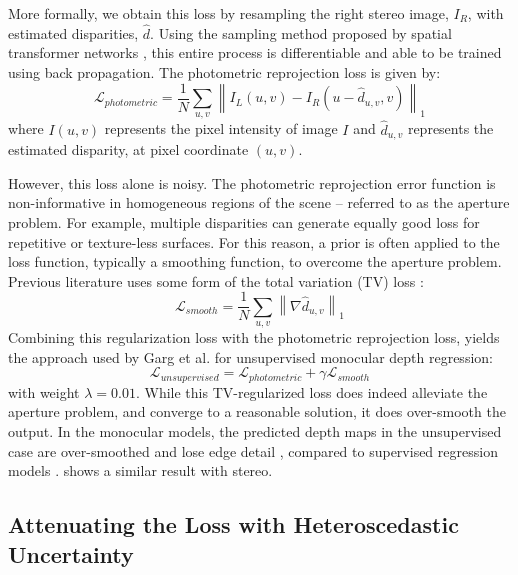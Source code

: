 More formally, we obtain this loss by resampling the right stereo image, $I_R$, with estimated disparities, $\hat{d}$. Using the sampling method proposed by spatial transformer networks \citep{jaderberg2015spatial}, this entire process is differentiable and able to be trained using back propagation. The photometric reprojection loss is given by:
\begin{equation}
\mathcal{L}_{photometric} = \frac{1}{N} \sum\limits_{u,v} \left\lVert I_L(u,v) - I_R(u-\hat{d}_{u,v},v) \right\rVert_1
\label{eqn:unsupervised_loss}
\end{equation}
where $I(u,v)$ represents the pixel intensity of image $I$ and $\hat{d}_{u,v}$ represents the estimated disparity, at pixel coordinate $(u,v)$.

However, this loss alone is noisy. The photometric reprojection error function is non-informative in homogeneous regions of the scene \citep{hartley2000} -- referred to as the aperture problem. For example, multiple disparities can generate equally good loss for repetitive or texture-less surfaces. For this reason, a prior is often applied to the loss function, typically a smoothing function, to overcome the aperture problem. Previous literature \citep{garg2016unsupervised} uses some form of the total variation (TV) loss \citep{rudin1992nonlinear}:
\begin{equation}
\mathcal{L}_{smooth} = \frac{1}{N} \sum\limits_{u,v} \left\lVert \nabla\hat{d}_{u,v} \right\rVert_1
\end{equation}
Combining this regularization loss with the photometric reprojection loss, yields the approach used by Garg et al. \citep{garg2016unsupervised} for unsupervised monocular depth regression:
\begin{equation}
\mathcal{L}_{unsupervised} = \mathcal{L}_{photometric} + \gamma \mathcal{L}_{smooth}
\label{eqn:smooth_loss}
\end{equation}
with weight $\lambda=0.01$. While this TV-regularized loss does indeed alleviate the aperture problem, and converge to a reasonable solution, it does over-smooth the output. In the monocular models, the predicted depth maps in the unsupervised case are over-smoothed and lose edge detail \citep{garg2016unsupervised}, compared to supervised regression models \citep{eigen2014depth}.  shows a similar result with stereo.

\subsection{Attenuating the Loss with Heteroscedastic \\Uncertainty}


